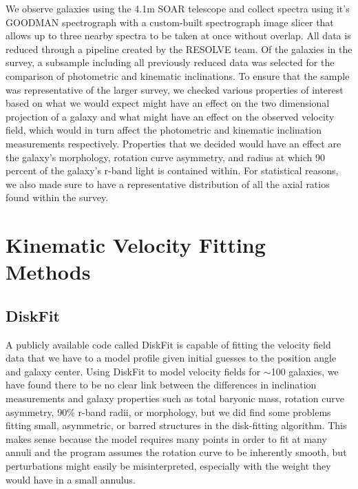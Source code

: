 \documentclass{emulateapj}
\begin{document}
We observe galaxies using the 4.1m SOAR telescope and collect spectra using it's GOODMAN spectrograph with a custom-built spectrograph image slicer that allows up to three nearby spectra to be taken at once without overlap. All data is reduced through a pipeline created by the RESOLVE team. Of the galaxies in the survey, a subsample including all previously reduced data was selected for the comparison of photometric and kinematic inclinations. To ensure that the sample was representative of the larger survey, we checked various properties of interest based on what we would expect might have an effect on the two dimensional projection of a galaxy and what might have an effect on the observed velocity field, which would in turn affect the photometric and kinematic inclination measurements respectively. Properties that we decided would have an effect are the galaxy's morphology, rotation curve asymmetry, and radius at which 90 percent of the galaxy's r-band light is contained within. For statistical reasons, we also made sure to have a representative distribution of all the axial ratios found within the survey.



\section{Kinematic Velocity Fitting Methods}

\subsection{DiskFit}

A publicly available code called DiskFit \citep{barnes} is capable of fitting the velocity field data that we have to a model profile given initial guesses to the position angle and galaxy center. Using DiskFit to model velocity fields for $\sim$100 galaxies, we have found there to be no clear link between the differences in inclination measurements and galaxy properties such as total baryonic mass, rotation curve asymmetry, 90\% r-band radii, or morphology, but we did find some problems fitting small, asymmetric, or barred structures in the disk-fitting algorithm. This makes sense because the model requires many points in order to fit at many annuli and the program assumes the rotation curve to be inherently smooth, but perturbations might easily be misinterpreted, especially with the weight they would have in a small annulus.
\end{document}
